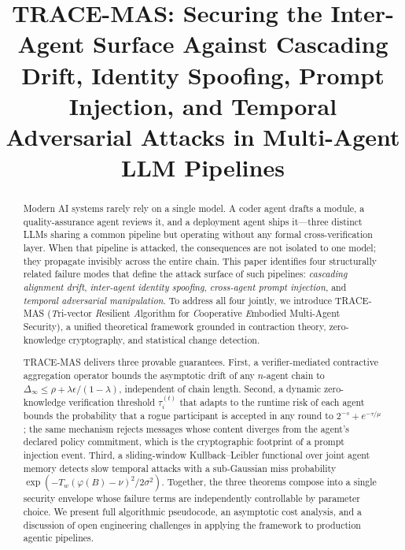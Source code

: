 \documentclass[conference]{IEEEtran}
\begin{document}
\title{TRACE-MAS: Securing the Inter-Agent Surface Against Cascading Drift,
Identity Spoofing, Prompt Injection, and Temporal Adversarial Attacks
in Multi-Agent LLM Pipelines}

\author{%
}

\maketitle

\begin{abstract}
Modern AI systems rarely rely on a single model. A coder agent
drafts a module, a quality-assurance agent reviews it, and a deployment
agent ships it---three distinct LLMs sharing a common pipeline but
operating without any formal cross-verification layer. When that pipeline
is attacked, the consequences are not isolated to one model; they propagate
invisibly across the entire chain. This paper identifies four structurally
related failure modes that define the attack surface of such pipelines:
\emph{cascading alignment drift}, \emph{inter-agent identity spoofing},
\emph{cross-agent prompt injection}, and \emph{temporal adversarial
manipulation}. To address all four jointly, we introduce
\textsc{TRACE-MAS} (\emph{T}ri-vector \emph{R}esilient
\emph{A}lgorithm for \emph{C}ooperative \emph{E}mbodied Multi-Agent
Security), a unified theoretical framework grounded in contraction theory,
zero-knowledge cryptography, and statistical change detection.

\textsc{TRACE-MAS} delivers three provable guarantees. First, a
verifier-mediated contractive aggregation operator bounds the asymptotic
drift of any $n$-agent chain to $\Delta_\infty \leq \rho + \lambda\epsilon/(1-\lambda)$,
independent of chain length. Second, a dynamic zero-knowledge verification
threshold $\tau_i^{(t)}$ that adapts to the runtime risk of each agent
bounds the probability that a rogue participant is accepted in any round to
$2^{-s} + e^{-\tau/\mu}$; the same mechanism rejects messages whose
content diverges from the agent's declared policy commitment, which is
the cryptographic footprint of a prompt injection event. Third, a
sliding-window Kullback--Leibler functional over joint agent memory
detects slow temporal attacks with a sub-Gaussian miss probability
$\exp(-T_w(\varphi(B) - \nu)^2 / 2\sigma^2)$.
Together, the three theorems compose into a single security envelope
whose failure terms are independently controllable by parameter choice.
We present full algorithmic pseudocode, an asymptotic cost analysis,
and a discussion of open engineering challenges in applying the
framework to production agentic pipelines.
\end{abstract}
\end{document}
